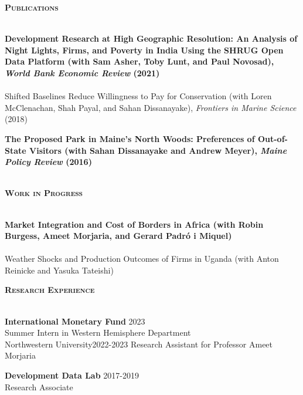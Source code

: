 \documentclass[11pt]{article}
\newcommand{\lineunder}{\vspace*{-8pt} \\ \hspace*{-18pt} \hrulefill \\}
\newcommand{\header}[1]{{\hspace*{-15pt}\vspace*{6pt} \textsc{#1}} \vspace*{-6pt} \lineunder}
\newcommand{\schoolwithcourses}[4]{
 \textbf{#1} \hfill{#2}\\
    #3\\
\vspace*{5pt}
}
\begin{document}
\header{\textbf{Publications}}
\vspace{2mm}
\schoolwithcourses{Development Research at High Geographic Resolution: An Analysis of Night Lights, Firms, and Poverty in India Using the SHRUG Open Data Platform \textnormal{(with Sam Asher, Toby Lunt, and Paul Novosad), \textit{World Bank Economic Review} (2021)}}{}{~\vspace{-3mm}}  

\schoolwithcourses{Shifted Baselines Reduce Willingness to Pay for Conservation \textnormal{(with Loren McClenachan, Shah Payal, and Sahan Dissanayake), \textit{Frontiers in Marine Science} (2018)}}{}{~\vspace{-3mm}} 

\schoolwithcourses{The Proposed Park in Maine's North Woods: Preferences of Out-of-State Visitors \textnormal{(with Sahan Dissanayake and Andrew Meyer), \textit{Maine Policy Review} (2016)}}{}{~\vspace{0mm}} 
\hfill{}


\header{\textbf{Work in Progress}}
\vspace{2mm}

\schoolwithcourses{Market Integration and Cost of Borders in Africa \textnormal{(with Robin Burgess, Ameet Morjaria, and Gerard Padr\'{o} i Miquel)}}{}{~\vspace{-3mm}}

\schoolwithcourses{Weather Shocks and Production Outcomes of Firms in Uganda \textnormal{(with Anton Reinicke and Yasuka Tateishi)}}{}{~\vspace{0mm}}{}




\header{\textbf{Research Experience}}
\vspace{2mm}
\schoolwithcourses{International Monetary Fund}{2023}{\hspace{2mm} Summer Intern in Western Hemisphere Department}

\schoolwithcourses{Northwestern University}{2022-2023}{\hspace{2mm} Research Assistant for Professor Ameet Morjaria}

\schoolwithcourses{Development Data Lab}{2017-2019}{\hspace{2mm} Research Associate}
\hfill{}
\vspace{3mm}
\end{document}
